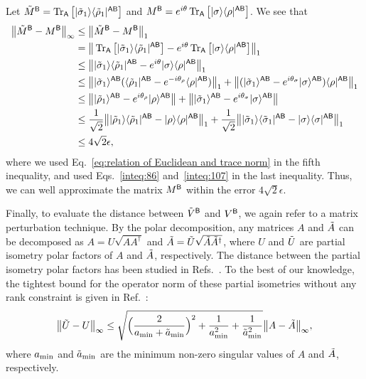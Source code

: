 Let $\tilde{M}^{\mathsf{B}} = \operatorname{Tr}_{{\mathsf{A}}}\big[|\tilde{\sigma}_1\rangle\langle\tilde{\rho}_1|^{{\mathsf{A}}{\mathsf{B}}}\big]$ and $M^{\mathsf{B}} = e^{i\theta}\operatorname{Tr}_{{\mathsf{A}}}\big[|\sigma\rangle\langle\rho|^{{\mathsf{A}}{\mathsf{B}}}\big]$.
We see that
\begin{align}
    \big\|\tilde{M}^{\mathsf{B}} - M^{\mathsf{B}}\big\|_\infty
    &\leq \big\|\tilde{M}^{\mathsf{B}} - M^{\mathsf{B}}\big\|_1 \\
    &= \big\|\operatorname{Tr}_{{\mathsf{A}}}\big[|\tilde{\sigma}_1\rangle\langle\tilde{\rho}_1|^{{\mathsf{A}}{\mathsf{B}}}\big] - e^{i\theta}\operatorname{Tr}_{{\mathsf{A}}}\big[|\sigma\rangle\langle\rho|^{{\mathsf{A}}{\mathsf{B}}}\big]\big\|_1 \\
    &\leq \big\||\tilde{\sigma}_1\rangle\langle\tilde{\rho}_1|^{{\mathsf{A}}{\mathsf{B}}}
    - e^{i\theta}|\sigma\rangle\langle\rho|^{{\mathsf{A}}{\mathsf{B}}}\big\|_1 \\
    &\leq \big\||\tilde{\sigma}_1\rangle^{{\mathsf{A}}{\mathsf{B}}}(\langle\tilde{\rho}_1|^{{\mathsf{A}}{\mathsf{B}}} - e^{-i\theta_\rho}\langle\rho|^{{\mathsf{A}}{\mathsf{B}}}) \big\|_1 +  \big\|(|\tilde{\sigma}_1\rangle^{{\mathsf{A}}{\mathsf{B}}} - e^{i\theta_\sigma}|\sigma\rangle^{{\mathsf{A}}{\mathsf{B}}})
    \langle\rho|^{{\mathsf{A}}{\mathsf{B}}}\big\|_1 \\
    &\leq \big\||\tilde{\rho}_1\rangle^{{\mathsf{A}}{\mathsf{B}}} - e^{i\theta_\rho}|\rho\rangle^{{\mathsf{A}}{\mathsf{B}}}\big\|
    + \big\||\tilde{\sigma}_1\rangle^{{\mathsf{A}}{\mathsf{B}}} - e^{i\theta_\sigma}|\sigma\rangle^{{\mathsf{A}}{\mathsf{B}}}\big\| \\
    &\leq \frac{1}{\sqrt{2}}\big\||\tilde{\rho}_1\rangle\langle\tilde{\rho}_1|^{{\mathsf{A}}{\mathsf{B}}} - |\rho\rangle\langle\rho|^{{\mathsf{A}}{\mathsf{B}}}\big\|_1 + \frac{1}{\sqrt{2}}\big\||\tilde{\sigma}_1\rangle\langle\tilde{\sigma}_1|^{{\mathsf{A}}{\mathsf{B}}} - |\sigma\rangle\langle\sigma|^{{\mathsf{A}}{\mathsf{B}}}\big\|_1    \\
    \label{inteq:37}
    &\leq 4\sqrt{2}\epsilon,
\end{align}
where we used Eq.~\eqref{eq:relation of Euclidean and trace norm} in the fifth inequality, and used Eqs.~\eqref{inteq:86} and~\eqref{inteq:107} in the last inequality.
Thus, we can well approximate the matrix $M^{\mathsf{B}}$ within the error $4\sqrt{2}\epsilon$.




Finally, to evaluate the distance between $\tilde{V}^{\mathsf{B}}$ and $V^{\mathsf{B}}$, we again refer to a matrix perturbation technique. 
By the polar decomposition, any matrices $A$ and $\tilde{A}$ can be decomposed as $A = U\sqrt{AA^\dag}$ and $\tilde{A} = \tilde{U}\sqrt{\tilde{A}\tilde{A}^\dag}$, where $U$ and $\tilde{U}$ are partial isometry polar factors of $A$ and $\tilde{A}$, respectively. 
The distance between the partial isometry polar factors has been studied in Refs.~\cite{Li1993AperturbGen, Li2002PertBound, Li2005SomeNewPerturb, XiaoShan2008VariationsQHfactor, Liu2008PerturbApprox, Li2008SubunitaryPolar, Zhang2013NewPerturb, Hong2014SomePertuPolarDecomp, Duong2016EffectOfPerturb, zhu2018NewPerturbationUniInv, Fu2020AnOptimallPerturb}.
To the best of our knowledge, the tightest bound for the operator norm of these partial isometries without any rank constraint is given in Ref.~\cite{Zhang2013NewPerturb}:
\begin{align}
\label{inteq:39}
    \big\|\tilde{U} - U\big\|_\infty 
    \leq \sqrt{\Big(\frac{2}{a_{\rm min} + \tilde{a}_{\rm min}}\Big)^2 + \frac{1}{a_{\rm min}^2} + \frac{1}{\tilde{a}_{\rm min}^2}} \big\|A-\tilde{A}\big\|_\infty,
\end{align}
where $a_{\rm min}$ and $\tilde{a}_{\rm min}$ are the minimum non-zero singular values of $A$ and $\tilde{A}$, respectively.

